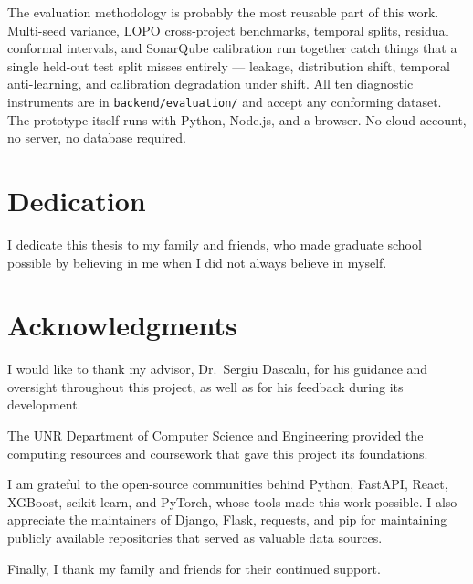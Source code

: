 \documentclass[12pt, oneside]{report}
\begin{document}
The evaluation methodology is probably the most reusable part of this work. Multi-seed variance, LOPO cross-project benchmarks, temporal splits, residual conformal intervals, and SonarQube calibration run together catch things that a single held-out test split misses entirely — leakage, distribution shift, temporal anti-learning, and calibration degradation under shift. All ten diagnostic instruments are in \texttt{backend/evaluation/} and accept any conforming dataset. The prototype itself runs with Python, Node.js, and a browser. No cloud account, no server, no database required.

\clearpage
\chapter*{Dedication}

I dedicate this thesis to my family and friends, who made graduate school possible by believing in me
when I did not always believe in myself.

\clearpage
\chapter*{Acknowledgments}

I would like to thank my advisor, Dr.\ Sergiu Dascalu, for his guidance and oversight throughout this project, as well as for his feedback during its development.

The UNR Department of Computer Science and Engineering provided the computing resources and coursework that gave this project its foundations.

I am grateful to the open-source communities behind Python, FastAPI, React, XGBoost, scikit-learn, and PyTorch, whose tools made this work possible. I also appreciate the maintainers of Django, Flask, requests, and pip for maintaining publicly available repositories that served as valuable data sources.

Finally, I thank my family and friends for their continued support.

\clearpage
\tableofcontents
\clearpage
\listoftables
\clearpage
\listoffigures
\end{document}
